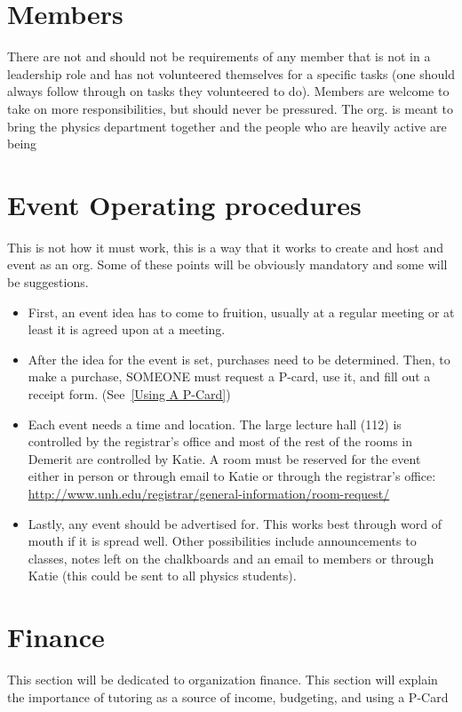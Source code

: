 \documentclass[12pt,epsfig]{article}
\begin{document}
\section{Members}
There are not and should not be requirements of any member that is not in a leadership role and has not volunteered themselves for a specific tasks (one should always follow through on tasks they volunteered to do). Members are welcome to take on more responsibilities, but should never be pressured. The org. is meant to bring the physics department together and the people who are heavily active are being  

\section{Event Operating procedures}
This is not how it must work, this is a way that it works to create and host and event as an org. Some of these points will be obviously mandatory and some will be suggestions.

\begin{itemize}
	\item First, an event idea has to come to fruition, usually at a regular meeting or at least it is agreed upon at a meeting. 

	\item After the idea for the event is set, purchases need to be determined. Then, to make a purchase, SOMEONE must request a P-card, use it, and fill out a receipt form. (See~\ref{Using A P-Card}) 

	\item Each event needs a time and location. The large lecture hall (112) is controlled by the registrar's office and most of the rest of the rooms in Demerit are controlled by Katie. A room must be reserved for the event either in person or through email to Katie or through the registrar's office: \url{http://www.unh.edu/registrar/general-information/room-request/}

	\item Lastly, any event should be advertised for. This works best through word of mouth if it is spread well. Other possibilities include announcements to classes, notes left on the chalkboards and an email to members or through Katie (this could be sent to all physics students).
\end{itemize}

\section{Finance}
This section will be dedicated to organization finance. This section will explain the importance of tutoring as a source of income, budgeting, and using a P-Card
\end{document}
